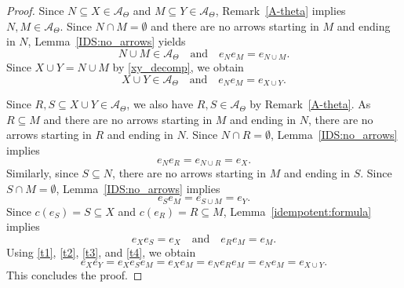 \documentclass[10pt,a4paper]{amsart}
\begin{document}
\begin{proof}
   Since $N \subseteq X \in \mathcal{A}_{\Theta}$ and 
   $M \subseteq Y \in \mathcal{A}_{\Theta}$, Remark~\ref{A-theta} implies $N, M \in \mathcal{A}_{\Theta}$.
   Since $N \cap M = \emptyset$ and there are no arrows starting in $M$ and ending in $N$, Lemma~\ref{IDS:no_arrows} yields 
   \[
   N \cup M \in \mathcal{A}_{\Theta} \quad \text{and} \quad e_N e_M = e_{N \cup M}.
   \]
   Since $X \cup Y = N \cup M$ by \eqref{xy_decomp}, we obtain 
   \begin{equation}\label{t1}
      X \cup Y \in \mathcal{A}_{\Theta} \quad \text{and} \quad e_N e_M = e_{X \cup Y}.
   \end{equation}
   
   Since $R, S \subseteq X \cup Y \in \mathcal{A}_{\Theta}$, we also have $R, S \in \mathcal{A}_{\Theta}$ by Remark~\ref{A-theta}.
   As $R \subseteq M$ and there are no arrows starting in $M$ and ending in $N$, there are no arrows starting in $R$ and ending in $N$.
   Since $N \cap R = \emptyset$, Lemma~\ref{IDS:no_arrows} implies 
   \begin{equation}\label{t2}
      e_N e_R = e_{N \cup R} = e_X.
   \end{equation}
   Similarly, since $S \subseteq N$, there are no arrows starting in $M$ and ending in $S$.
   Since $S \cap M = \emptyset$, Lemma~\ref{IDS:no_arrows} implies 
   \begin{equation}\label{t3}
      e_S e_M = e_{S \cup M} = e_Y.
   \end{equation}
   Since $c(e_S) = S \subseteq X$ and $c(e_R) = R \subseteq M$, Lemma~\ref{idempotent:formula} implies 
   \begin{equation}\label{t4}
      e_X e_S = e_X \quad \text{and} \quad e_R e_M = e_M.
   \end{equation}
   Using \eqref{t1}, \eqref{t2}, \eqref{t3}, and \eqref{t4}, we obtain
   \[
   e_X e_Y = e_X e_S e_M = e_X e_M = e_N e_R e_M = e_N e_M = e_{X \cup Y}.
   \]
   This concludes the proof.
\end{proof}
\end{document}
